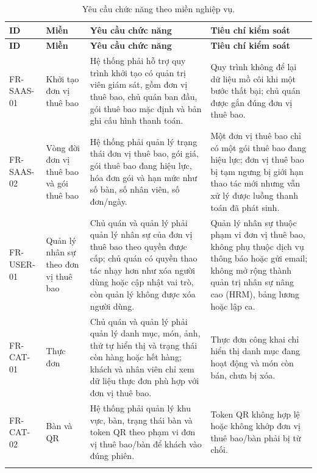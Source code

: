 \begin{longtable}{@{}>{\raggedright\arraybackslash}p{}>{\raggedright\arraybackslash}p{}>{\raggedright\arraybackslash}p{}>{\raggedright\arraybackslash}p{}@{}}
\caption{Yêu cầu chức năng theo miền nghiệp vụ.}
\label{tab:chapter3-functional-requirements}\\
\toprule
\textbf{ID} & \textbf{Miền} & \textbf{Yêu cầu chức năng} & \textbf{Tiêu chí kiểm soát} \\
\midrule
\endfirsthead
\toprule
\textbf{ID} & \textbf{Miền} & \textbf{Yêu cầu chức năng} & \textbf{Tiêu chí kiểm soát} \\
\midrule
\endhead
FR-SAAS-01 & Khởi tạo đơn vị thuê bao & Hệ thống phải hỗ trợ quy trình khởi tạo có quản trị viên giám sát, gồm đơn vị thuê bao, chủ quán ban đầu, gói thuê bao mặc định và bản ghi cấu hình thanh toán. & Quy trình không để lại dữ liệu mồ côi khi một bước thất bại; chủ quán được gắn đúng đơn vị thuê bao. \\
\addlinespace
FR-SAAS-02 & Vòng đời đơn vị thuê bao và gói thuê bao & Hệ thống phải quản lý trạng thái đơn vị thuê bao, gói giá, gói thuê bao đang hiệu lực, hóa đơn gói và hạn mức như số bàn, số nhân viên, số đơn/ngày. & Một đơn vị thuê bao chỉ có một gói thuê bao đang hiệu lực; đơn vị thuê bao bị tạm ngưng bị giới hạn thao tác mới nhưng vẫn xử lý được luồng thanh toán đã phát sinh. \\
\addlinespace
FR-USER-01 & Quản lý nhân sự theo đơn vị thuê bao & Chủ quán và quản lý phải quản lý nhân sự của đơn vị thuê bao theo quyền được cấp; chủ quán có quyền thao tác nhạy hơn như xóa người dùng hoặc cập nhật vai trò, còn quản lý không được xóa người dùng. & Quản lý nhân sự thuộc phạm vi đơn vị thuê bao, không phụ thuộc dịch vụ thông báo hoặc gửi email; không mở rộng thành quản trị nhân sự nâng cao (HRM), bảng lương hoặc lập ca. \\
\addlinespace
FR-CAT-01 & Thực đơn & Chủ quán và quản lý phải quản lý danh mục, món, ảnh, thứ tự hiển thị và trạng thái còn hàng hoặc hết hàng; khách và nhân viên chỉ xem dữ liệu thực đơn phù hợp với đơn vị thuê bao. & Thực đơn công khai chỉ hiển thị danh mục đang hoạt động và món còn bán, chưa bị xóa. \\
\addlinespace
FR-CAT-02 & Bàn và QR & Hệ thống phải quản lý khu vực, bàn, trạng thái bàn và token QR theo phạm vi đơn vị thuê bao/bàn để khách vào đúng phiên. & Token QR không hợp lệ hoặc không khớp đơn vị thuê bao/bàn phải bị từ chối. \\
\addlinespace

\end{longtable}
